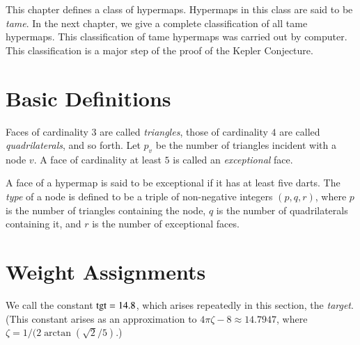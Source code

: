 





\label{sec:tame}


This chapter defines a class of hypermaps.  Hypermaps in this class
are said to be {\it tame}.  In the next chapter, we give a complete
classification of all tame hypermaps.  This classification of tame
hypermaps was carried out by computer.   This classification is a
major step of the proof of the Kepler Conjecture.

\section{Basic Definitions}


\begin{definition}
Faces of cardinality $3$ are called {\it triangles}, those of
cardinality $4$ are called {\it quadrilaterals}, and so forth. Let
$p_v$ be the number of triangles incident with a node $v$. A face of
cardinality at least $5$ is called an {\it exceptional\/} face.
\end{definition}

\begin{definition}\label{definition:type}
A face of a hypermap is said to be exceptional if it has at least
five darts.  The {\it type\/} of a node is defined to be a triple of
non-negative integers $(p,q,r)$, where $p$ is the number of
triangles containing the node, $q$ is the number of quadrilaterals
containing it, and $r$ is the number of exceptional faces.
%
\end{definition}


\section{Weight Assignments}\label{sec:wtassign}

We call the constant ${\operatorname{tgt}}=14.8$, which arises repeatedly in
this section, the {\it target}.  (This constant arises as an
approximation to $4\pi\zeta -8\approx 14.7947$, where $\zeta =
1/(2\arctan(\sqrt{2}/5)$.)
%

